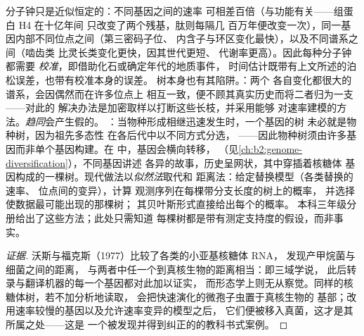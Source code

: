 \begin{proposition}[分子钟与树的陷阱]\label{prop:b2:phylogenetic-trees:pitfalls}
分子钟只是近似恒定的：不同基因之间的速率
可相差百倍（与功能有关——组蛋白 H4 在十亿年间
只改变了两个残基，肽则每隔几
百万年便改变一次），同一基因内部不同位点之间（第三密码子位、
内含子与环区变化最快），以及不同谱系之间（啮齿类
比灵长类变化更快，因其世代更短、
代谢率更高）。因此每种分子钟都需要
\emph{校准}，即借助化石或确定年代的地质事件，
时间估计既带有上文所述的泊松误差，也带有校准本身的误差。
树本身也有其陷阱。\emph{}：两个
各自变化都很大的谱系，会因偶然而在许多位点上
相互一致，便不顾其真实历史而将二者归为一支——对此的
解决办法是加密取样以打断这些长枝，并采用能够
对速率建模的方法。\emph{趋同}会产生假的。
\emph{}：当物种形成相继迅速发生时，一个基因的树
未必就是物种树，因为祖先多态性
在各后代中以不同方式分选，
——因此物种树须由许多基因而非单个基因构建。在
中，基因会横向转移，
（见\cref{ch:b2:genome-diversification}），不同基因讲述
各异的故事，历史呈网状，其中穿插着核糖体
基因构成的一棵树。现代做法以\emph{似然法}取代和
距离法：给定替换模型（各类替换的速率、
位点间的变异），计算
观测序列在每棵带分支长度的树上的概率，
并选择使数据最可能出现的那棵树；
其贝叶斯形式直接给出每个的概率。
本科三年级分册给出了这些方法；此处只需知道
每棵树都是带有测定支持度的假设，而非事实。
\end{proposition}
\begin{proof}[证据]
沃斯与福克斯（1977）比较了各类的小亚基核糖体 RNA，
发现产甲烷菌与细菌之间的距离，
与两者中任一个到真核生物的距离相当：即三域学说，
此后转录与翻译机器的每一个基因都对此加以证实，
而形态学上则无从察觉。同样的核糖体树，若不加分析地读取，
会把快速演化的微孢子虫置于真核生物的
基部；改用速率较慢的基因以及允许速率变异的模型之后，
它们便被移入真菌，这才是其所属之处——这是
一个被发现并得到纠正的的教科书式案例。
\end{proof}


